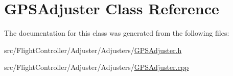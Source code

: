 \hypertarget{classGPSAdjuster}{}\section{G\+P\+S\+Adjuster Class Reference}
\label{classGPSAdjuster}


The documentation for this class was generated from the following files\+:\begin{DoxyCompactItemize}
\item 
src/\+Flight\+Controller/\+Adjuster/\+Adjusters/\hyperlink{GPSAdjuster_8h}{G\+P\+S\+Adjuster.\+h}\item 
src/\+Flight\+Controller/\+Adjuster/\+Adjusters/\hyperlink{GPSAdjuster_8cpp}{G\+P\+S\+Adjuster.\+cpp}\end{DoxyCompactItemize}
